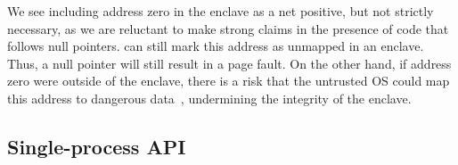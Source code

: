 
We see including address zero in the enclave as a net positive, but not strictly necessary, as we are reluctant to make strong claims 
in the presence of code that follows null pointers.
\graphenesgx{} can still mark this address as unmapped in an enclave.
Thus, a null pointer will still result in a page fault.
On the other hand, if address zero were outside of the enclave,
there is a risk that the untrusted OS could map this address to dangerous data~\cite{cve-2009-2692},
undermining the integrity of the enclave.
 
 

 





\subsection{Single-process API}
\label{sec:sgx:shield:abi}


%



